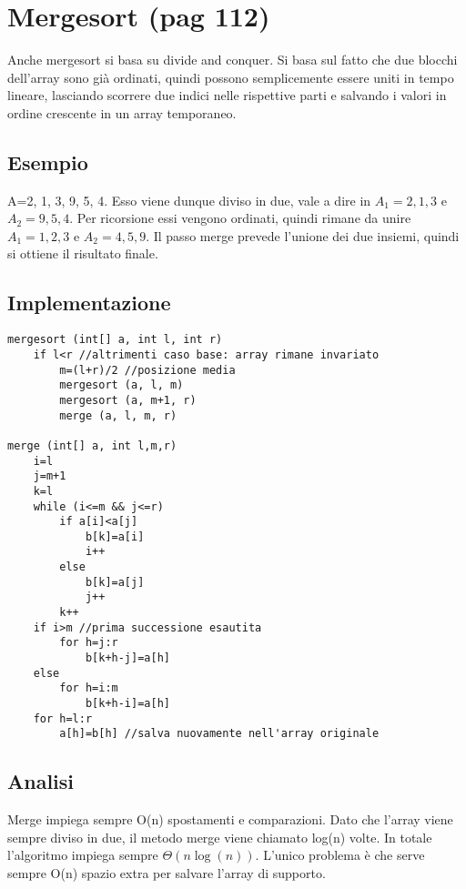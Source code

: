\documentclass[a4paper]{book}
\begin{document}
\section{Mergesort (pag 112)}
Anche mergesort si basa su divide and conquer. Si basa sul fatto che due blocchi dell'array sono già ordinati, quindi possono semplicemente essere uniti in tempo lineare, lasciando scorrere due indici nelle rispettive parti e salvando i valori in ordine crescente in un array temporaneo.

\subsection*{Esempio}
A=2, 1, 3, 9, 5, 4. Esso viene dunque diviso in due, vale a dire in $A_1 =2,1,3$ e $A_2 =9,5,4$. Per ricorsione essi vengono ordinati, quindi rimane da unire $A_1 =1,2,3$ e $A_2 =4,5,9$. Il passo merge prevede l'unione dei due insiemi, quindi si ottiene il risultato finale.

\subsection*{Implementazione}
\begin{lstlisting}
mergesort (int[] a, int l, int r)
	if l<r //altrimenti caso base: array rimane invariato
		m=(l+r)/2 //posizione media
		mergesort (a, l, m)
		mergesort (a, m+1, r)
		merge (a, l, m, r)
		
merge (int[] a, int l,m,r)
	i=l
	j=m+1
	k=l
	while (i<=m && j<=r)
		if a[i]<a[j]
			b[k]=a[i]
			i++
		else
			b[k]=a[j]
			j++
		k++
	if i>m //prima successione esautita
		for h=j:r
			b[k+h-j]=a[h]
	else
		for h=i:m
			b[k+h-i]=a[h]
	for h=l:r
		a[h]=b[h] //salva nuovamente nell'array originale									
\end{lstlisting}
\subsection*{Analisi}
Merge impiega sempre O(n) spostamenti e comparazioni. Dato che l'array viene sempre diviso in due, il metodo merge viene chiamato log(n) volte. In totale l'algoritmo impiega sempre $\Theta (n \log(n))$. L'unico problema è che serve sempre O(n) spazio extra per salvare l'array di supporto.
\end{document}
